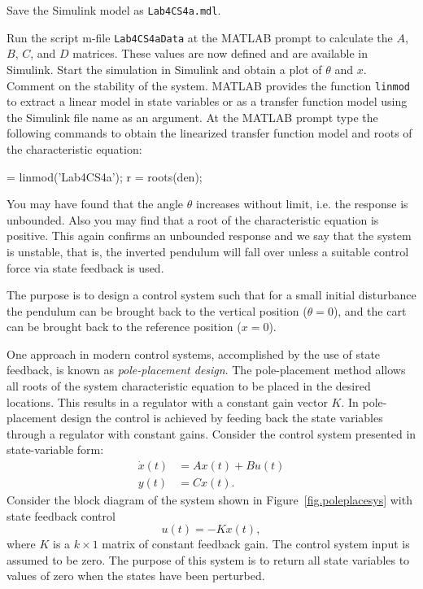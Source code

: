 Save the Simulink model as \texttt{Lab4CS4a.mdl}.
\par
Run the script m-file \texttt{Lab4CS4aData} at the MATLAB prompt to calculate the $A$, $B$, $C$, and $D$ matrices.  These values are now defined and are available in Simulink.  Start the simulation in Simulink and obtain a plot of $\theta$ and $x$.  Comment on the stability of the system.  MATLAB provides the function \texttt{linmod} to extract a linear model in state variables or as a transfer function model using the Simulink file name as an argument.  At the MATLAB prompt type the following commands to obtain the linearized transfer function model and roots of the characteristic equation:

\begin{codex}
 = linmod('Lab4CS4a');
r = roots(den);
\end{codex}

You may have found that the angle $\theta$ increases without limit, i.e. the response is unbounded.  Also you may find that a root of the characteristic equation is positive.  This again confirms an unbounded response and we say that the system is unstable, that is, the inverted pendulum will fall over unless a suitable control force via state feedback is used.
\par
The purpose is to design a control system such that for a small initial disturbance the pendulum can be brought back to the vertical position ($\theta = 0$), and the cart can be brought back to the reference position ($x=0$).
\par
One approach in modern control systems, accomplished by the use of state feedback, is known as \textit{pole-placement design}.  The pole-placement method allows all roots of the system characteristic equation to be placed in the desired locations.  This results in a regulator with a constant gain vector $K$.  In pole-placement design the control is achieved by feeding back the state variables through a regulator with constant gains.  Consider the control system presented in state-variable form:
\begin{subequations}    \label{eq.statespace}
    \begin{flalign}
        \dot{x}(t) &= Ax(t) + Bu(t) \\
        y(t)        &= Cx(t).
    \end{flalign}
\end{subequations}
Consider the block diagram of the system shown in Figure~\ref{fig.poleplacesys} with state feedback control
\begin{equation}    \label{eq.statefeedback}
    u(t) = -Kx(t),
\end{equation}
where $K$ is a $k\times 1$ matrix of constant feedback gain.  The control system input is assumed
to be zero. The purpose of this system is to return all state variables to values of zero when
the states have been perturbed.

